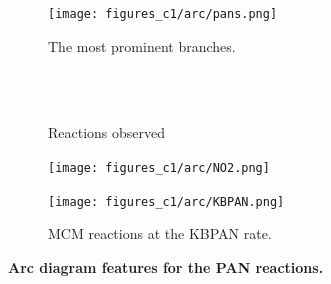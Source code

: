 \begin{figure}[H]
     \centering
      \begin{subfigure}[b]{.4\textwidth}
         \centering
         \texttt{[image: figures\_c1/arc/pans.png]}
         \caption{The most prominent branches. }
         \label{fig:pansdir}
     \end{subfigure}
      \begin{subfigure}[b]{.4\textwidth}
         \centering
            \\ \ \\
    \hfill
         \caption{Reactions observed}
         \label{fig:rxnpan}
     \end{subfigure}
     \begin{subfigure}[b]{.4\textwidth}
         \centering
         \texttt{[image: figures\_c1/arc/NO2.png]}
         \caption{}
         \label{fig:no2}
     \end{subfigure}
     \begin{subfigure}[b]{.4\textwidth}
         \centering
         \texttt{[image: figures\_c1/arc/KBPAN.png]}
         \caption{MCM reactions at the KBPAN rate.}
         \label{fig:kbpan}
     \end{subfigure}
      \caption{\textbf{ Arc diagram features for the PAN reactions. } }
        \label{fig:ohho2}
\end{figure}




